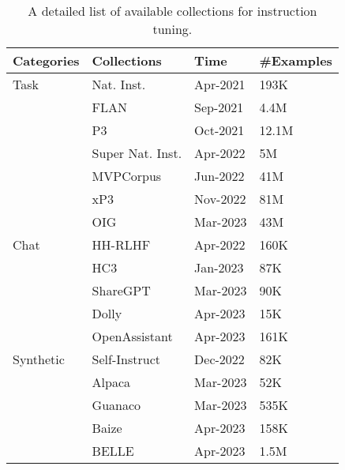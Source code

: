 \begin{table}[htbp]
	\centering
	\caption{A detailed list of available collections for instruction tuning.}
	\label{tab:instruction_tuning}
	\begin{tabularx}{\textwidth}{|X|X|X|X|}
		\hline
		\textbf{Categories} & \textbf{Collections}                        & \textbf{Time} & \textbf{\#Examples} \\
		\hline
		Task                & Nat. Inst. \cite{mishra2022crosstask}       & Apr-2021      & 193K                \\
		                    & FLAN~\cite{wei2022fine}                     & Sep-2021      & 4.4M                \\
		                    & P3~\cite{bach2022promptsource}              & Oct-2021      & 12.1M               \\
		                    & Super Nat. Inst. \cite{wang2022super}       & Apr-2022      & 5M                  \\
		                    & MVPCorpus~\cite{tang2022mvp}                & Jun-2022      & 41M                 \\
		                    & xP3~\cite{muennighoff2022crosslingual}      & Nov-2022      & 81M                 \\
		                    & OIG~\cite{vaswani2023attention}             & Mar-2023      & 43M                 \\
		\hline
		Chat                & HH-RLHF~\cite{bai2022training}              & Apr-2022      & 160K                \\
		                    & HC3~\cite{guo2023close}                     & Jan-2023      & 87K                 \\
		                    & ShareGPT~\cite{devlin2019bert}              & Mar-2023      & 90K                 \\
		                    & Dolly~\cite{lewis2020bart}                  & Apr-2023      & 15K                 \\
		                    & OpenAssistant~\cite{koepf2023openassistant} & Apr-2023      & 161K                \\
		\hline
		Synthetic           & Self-Instruct~\cite{wang2022selfinstruct}   & Dec-2022      & 82K                 \\
		                    & Alpaca~\cite{taori2023stanford}             & Mar-2023      & 52K                 \\
		                    & Guanaco~\cite{fedus2021switch}              & Mar-2023      & 535K                \\
		                    & Baize~\cite{xu2023baize}                    & Apr-2023      & 158K                \\
		                    & BELLE~\cite{ji2023towards}                  & Apr-2023      & 1.5M                \\
		\hline
	\end{tabularx}
\end{table}

